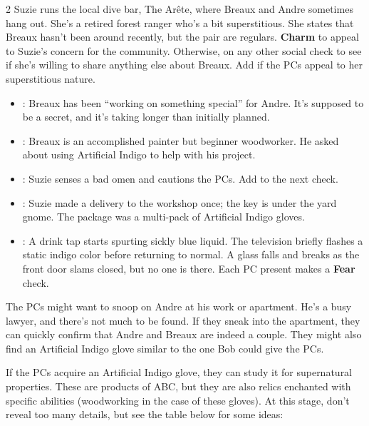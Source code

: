 \documentclass{book}
\newcommand{\df}{\DifficultyDie }
\newcommand{\stb}{\SetbackDie }
\newcommand{\ch}{\ChallengeDie }
\newcommand{\bbb}{\BoostDie }
\newcommand{\ai}{{\color{cyan}Artificial Indigo}\xspace}
\begin{document}
\begin{multicols*}{2}
\vspace{-2em}
Suzie runs the local dive bar, The Ar\^ete, where Breaux and Andre sometimes hang out.  She's a retired forest ranger who's a bit superstitious.  She states that Breaux hasn't been around recently, but the pair are regulars.  \ch\df\bbb \textbf{Charm} to appeal to Suzie's concern for the community.  Otherwise, \df\df\df on any other social check to see if she's willing to share anything else about Breaux.  Add \bbb if the PCs appeal to her superstitious nature.

\vspace{-2em}
\begin{itemize}
\setlength\itemsep{-.5em}
    \item \Success: Breaux has been ``working on something special'' for Andre.  It's supposed to be a secret, and it's taking longer than initially planned.
    \item \Advantage\Advantage: Breaux is an accomplished painter but beginner woodworker.  He asked about using \ai to help with his project.
    \item \Threat\Threat: Suzie senses a bad omen and cautions the PCs.  Add \stb to the next check.  
    \item \Triumph:  Suzie made a delivery to the workshop once; the key is under the yard gnome.  The package was a multi-pack of \ai gloves.
    \item \Despair:  A drink tap starts spurting sickly blue liquid.  The television briefly flashes a static indigo color before returning to normal.  A glass falls and breaks as the front door slams closed, but no one is there.  Each PC present makes a \df\df \textbf{Fear} check.
\end{itemize}

\vspace{-2em}
The PCs might want to snoop on Andre at his work or apartment.  He's a busy lawyer, and there's not much to be found.  If they sneak into the apartment, they can quickly confirm that Andre and Breaux are indeed a couple.  They might also find an \ai glove similar to the one Bob could give the PCs.

If the PCs acquire an \ai glove, they can study it for supernatural properties.  These are products of ABC, but they are also relics enchanted with specific abilities (woodworking in the case of these gloves).  At this stage, don't reveal too many details, but see the table below for some ideas:


\end{multicols*}
\end{document}
